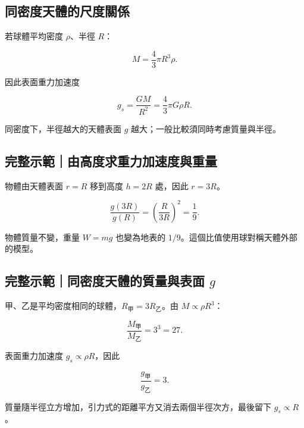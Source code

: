 \documentclass[11pt,a4paper]{article}
\begin{document}
\subsection{同密度天體的尺度關係}\label{ux540cux5bc6ux5ea6ux5929ux9ad4ux7684ux5c3aux5ea6ux95dcux4fc2}

若球體平均密度 \(\rho\)、半徑 \(R\)：

\[
M=\frac43\pi R^3\rho.
\]

因此表面重力加速度

\[
g_s=\frac{GM}{R^2}=\frac43\pi G\rho R.
\]

同密度下，半徑越大的天體表面 \(g\) 越大；一般比較須同時考慮質量與半徑。

\begin{HandoutWorkedExample}

\subsection{完整示範｜由高度求重力加速度與重量}\label{ux5b8cux6574ux793aux7bc4ux7531ux9ad8ux5ea6ux6c42ux91cdux529bux52a0ux901fux5ea6ux8207ux91cdux91cf}

物體由天體表面 \(r=R\) 移到高度 \(h=2R\) 處，因此 \(r=3R\)。

\[
\frac{g(3R)}{g(R)}
=\left(\frac{R}{3R}\right)^2
=\frac19.
\]

物體質量不變，重量 \(W=mg\) 也變為地表的 \(1/9\)。這個比值使用球對稱天體外部的模型。

\end{HandoutWorkedExample}

\begin{HandoutWorkedExample}

\subsection{\texorpdfstring{完整示範｜同密度天體的質量與表面 \(g\)}{完整示範｜同密度天體的質量與表面 g}}\label{ux5b8cux6574ux793aux7bc4ux540cux5bc6ux5ea6ux5929ux9ad4ux7684ux8ceaux91cfux8207ux8868ux9762-g}

甲、乙是平均密度相同的球體，\(R_{\text{甲}}=3R_{\text{乙}}\)。由 \(M\propto\rho R^3\)：

\[
\frac{M_{\text{甲}}}{M_{\text{乙}}}=3^3=27.
\]

表面重力加速度 \(g_s\propto\rho R\)，因此

\[
\frac{g_{\text{甲}}}{g_{\text{乙}}}=3.
\]

質量隨半徑立方增加，引力式的距離平方又消去兩個半徑次方，最後留下 \(g_s\propto R\)。

\end{HandoutWorkedExample}
\end{document}
